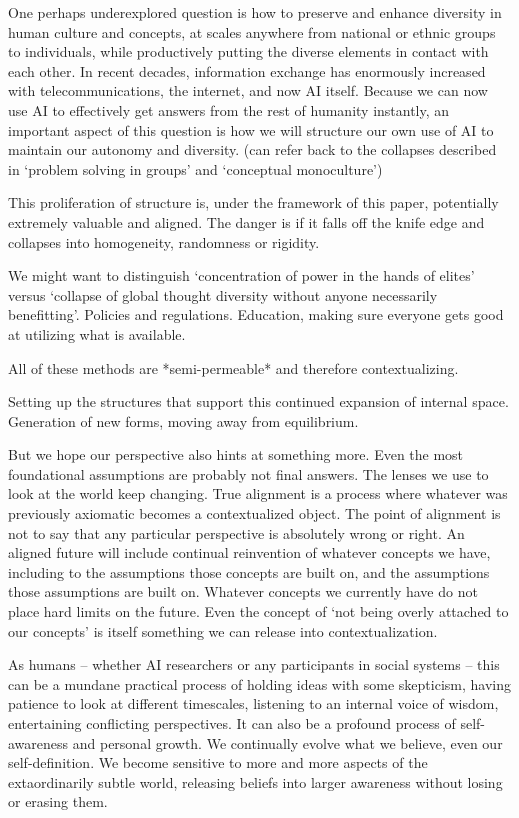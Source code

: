 \documentclass[12pt]{article}
\begin{document}
One perhaps underexplored question is how to preserve and enhance diversity in human culture and concepts, at scales anywhere from national or ethnic groups to individuals, while productively putting the diverse elements in contact with each other. In recent decades, information exchange has enormously increased with telecommunications, the internet, and now AI itself. Because we can now use AI to effectively get answers from the rest of humanity instantly, an important aspect of this question is how we will structure our own use of AI to maintain our autonomy and diversity. (can refer back to the collapses described in `problem solving in groups' and `conceptual monoculture')

This proliferation of structure is, under the framework of this paper, potentially extremely valuable and aligned. The danger is if it falls off the knife edge and collapses into homogeneity, randomness or rigidity. 

We might want to distinguish `concentration of power in the hands of elites' versus `collapse of global thought diversity without anyone necessarily benefitting'. Policies and regulations. Education, making sure everyone gets good at utilizing what is available.

All of these methods are *semi-permeable* and therefore contextualizing.

Setting up the structures that support this continued expansion of internal space. Generation of new forms, moving away from equilibrium. 

But we hope our perspective also hints at something more. Even the most foundational assumptions are probably not final answers. The lenses we use to look at the world keep changing. True alignment is a process where whatever was previously axiomatic becomes a contextualized object. The point of alignment is not to say that any particular perspective is absolutely wrong or right. An aligned future will include continual reinvention of whatever concepts we have, including to the assumptions those concepts are built on, and the assumptions those assumptions are built on. Whatever concepts we currently have do not place hard limits on the future. Even the concept of `not being overly attached to our concepts' is itself something we can release into contextualization.

As humans -- whether AI researchers or any participants in social systems -- this can be a mundane practical process of holding ideas with some skepticism, having patience to look at different timescales, listening to an internal voice of wisdom, entertaining conflicting perspectives. It can also be a profound process of self-awareness and personal growth. We continually evolve what we believe, even our self-definition. We become sensitive to more and more aspects of the extaordinarily subtle world, releasing beliefs into larger awareness without losing or erasing them. 
\end{document}
